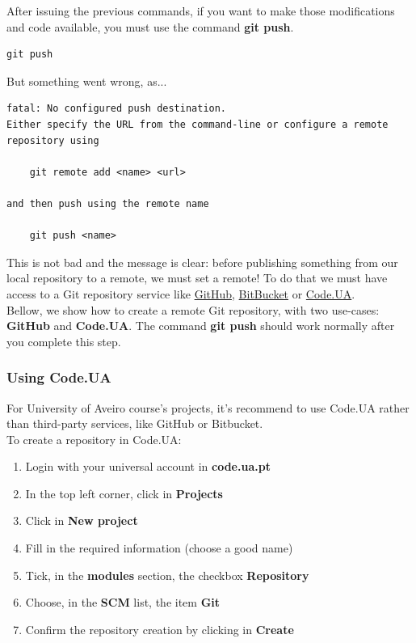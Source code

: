 \documentclass{article}
\begin{document}
After issuing the previous commands, if you want to make those modifications and code available, you must use the command \textbf{git push}.

\begin{lstlisting}
git push
\end{lstlisting}

But something went wrong, as...

\begin{lstlisting}
fatal: No configured push destination.
Either specify the URL from the command-line or configure a remote repository using

    git remote add <name> <url>

and then push using the remote name

    git push <name>

\end{lstlisting}

This is not bad and the message is clear: before publishing something from our local repository to a remote, we must set a remote! To do that we must have access to a Git repository service like \href{https://github.com}{GitHub}, \href{https://bitbucket.org}{BitBucket} or \href{http://code.ua.pt}{Code.UA}. \\

Bellow, we show how to create a remote Git repository, with two use-cases: \textbf{GitHub} and \textbf{Code.UA}. The command \textbf{git push} should work normally after you complete this step.

\subsubsection{Using Code.UA}

For University of Aveiro course's projects, it's recommend to use Code.UA rather than third-party services, like GitHub or Bitbucket.\\

To create a repository in Code.UA:

\begin{enumerate}
\item Login with your universal account in\underline{} \textbf{code.ua.pt}
\item In the top left corner, click in \textbf{Projects}
\item Click in \textbf{New project}
\item Fill in the required information (choose a good name)
\item Tick, in the \textbf{modules} section, the checkbox \textbf{Repository}
\item Choose, in the \textbf{SCM} list, the item \textbf{Git}
\item Confirm the repository creation by clicking in \textbf{Create}
\end{enumerate}
\end{document}
